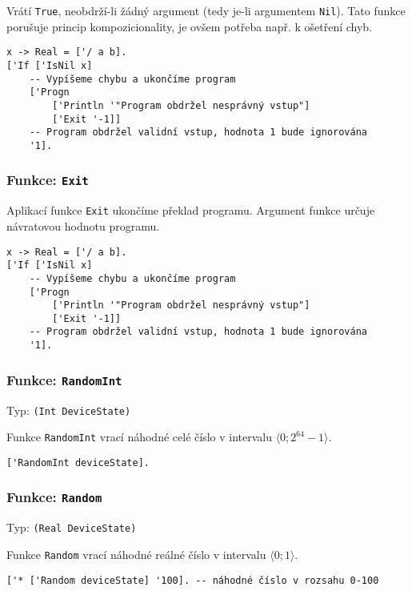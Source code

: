 Vrátí \lstinline{True}, neobdrží-li žádný argument (tedy je-li argumentem \lstinline{Nil}). Tato
funkce porušuje princip kompozicionality, je ovšem potřeba např. k ošetření chyb.

\begin{lstlisting}[caption={Ukázka využití IsNil}]
x -> Real = ['/ a b].
['If ['IsNil x]
    -- Vypíšeme chybu a ukončíme program
    ['Progn
        ['Println '"Program obdržel nesprávný vstup"]
        ['Exit '-1]]
    -- Program obdržel validní vstup, hodnota 1 bude ignorována
    '1].
\end{lstlisting}

\subsubsection*{Funkce: \lstinline{Exit}}

Aplikací funkce \lstinline{Exit} ukončíme překlad programu. Argument funkce určuje návratovou
hodnotu programu.

\begin{lstlisting}[caption={Ukázka využití Exit}]
x -> Real = ['/ a b].
['If ['IsNil x]
    -- Vypíšeme chybu a ukončíme program
    ['Progn
        ['Println '"Program obdržel nesprávný vstup"]
        ['Exit '-1]]
    -- Program obdržel validní vstup, hodnota 1 bude ignorována
    '1].
\end{lstlisting}

\subsubsection*{Funkce: \lstinline{RandomInt}}
Typ: \lstinline{(Int DeviceState)}

Funkce \lstinline{RandomInt} vrací náhodné celé číslo v intervalu $\bigl \langle 0; 2^{64}-1 \bigr \rangle$.

\begin{lstlisting}[caption={Ukázka využití RandomInt}]
['RandomInt deviceState].
\end{lstlisting}

\subsubsection*{Funkce: \lstinline{Random}}
Typ: \lstinline{(Real DeviceState)}

Funkce \lstinline{Random} vrací náhodné reálné číslo v intervalu $\bigl \langle 0; 1 \bigr \rangle$.

\begin{lstlisting}[caption={Ukázka využití Random}]
['* ['Random deviceState] '100]. -- náhodné číslo v rozsahu 0-100
\end{lstlisting}

